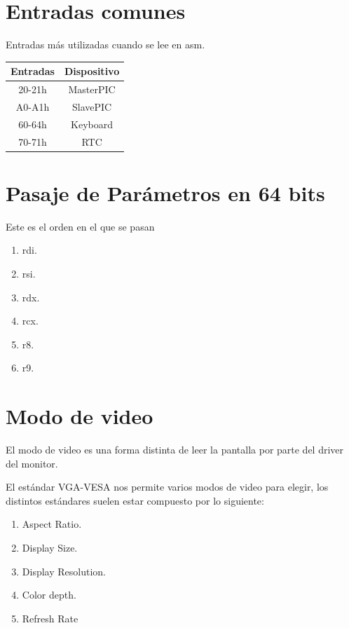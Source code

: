 \documentclass[]{article}
\begin{document}
\section*{Entradas comunes}
Entradas m\'as utilizadas cuando se lee en asm.
\begin{center}
	\begin{tabular}{ |c|c| }
		\hline
		Entradas & Dispositivo\\
		\hline	
		20-21h & MasterPIC\\
		A0-A1h & SlavePIC\\
		60-64h & Keyboard\\
		70-71h & RTC\\
		\hline
	\end{tabular}
\end{center}

\section*{Pasaje de Par\'ametros en 64 bits}
Este es el orden en el que se pasan

\begin{center}
	\begin{enumerate}
		\item rdi.
		\item rsi.
		\item rdx.
		\item rcx.
		\item r8.
		\item r9.
	\end{enumerate}
\end{center}

\section*{Modo de video}

El modo de video es una forma distinta de leer la pantalla por parte del driver del monitor.

El est\'andar VGA-VESA nos permite varios modos de video para elegir, los distintos est\'andares suelen estar compuesto por lo siguiente:

	\begin{enumerate}
		\item Aspect Ratio.
		\item Display Size.
		\item Display Resolution.
		\item Color depth.
		\item Refresh Rate
	\end{enumerate}
\end{document}
